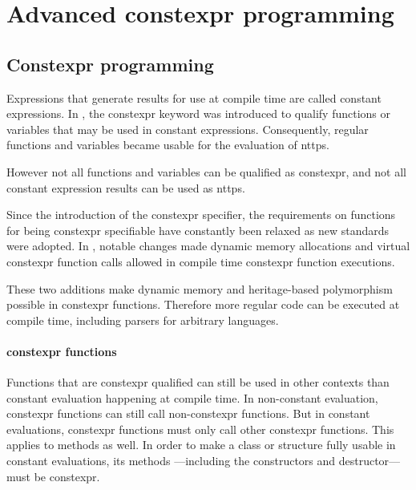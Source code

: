 \documentclass[../main]{subfiles}
\begin{document}

\section{
  Advanced constexpr programming
}


\subsection{
  Constexpr programming
}
\label{lbl:constexpr-programming}

Expressions that generate results for use at compile time are called
constant expressions. In , the \gls{constexpr} keyword was introduced
to qualify functions or variables that may be used in constant expressions.
Consequently, regular functions and variables became usable for the evaluation
of \glspl{nttp}.

However not all functions and variables can be qualified as \gls{constexpr},
and not all constant expression results can be used as \glspl{nttp}.

Since the introduction of the \gls{constexpr} specifier, the requirements on
functions for being \gls{constexpr} specifiable have constantly been relaxed as new
\cpp standards were adopted. In , notable changes made dynamic memory
allocations\cite{constexpr-memory} and virtual \gls{constexpr} function
calls\cite{virtual-constexpr} allowed in compile time \gls{constexpr} function
executions.

These two additions make dynamic memory and heritage-based polymorphism
possible in \gls{constexpr} functions. Therefore more regular \cpp code can be
executed at compile time, including parsers for arbitrary languages.

\paragraph{\gls{constexpr} functions} Functions that are \gls{constexpr} qualified can
still be used in other contexts than constant evaluation happening at
compile time. In non-constant evaluation, \gls{constexpr} functions can still call
non-\gls{constexpr} functions. But in constant evaluations, \gls{constexpr} functions must
only call other \gls{constexpr} functions. This applies to methods as well.
In order to make a \cpp class or structure fully usable in constant evaluations,
its methods ---including the constructors and destructor--- must be \gls{constexpr}.
\end{document}
